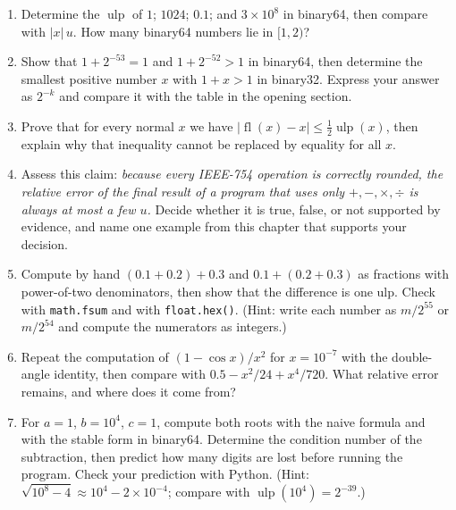 \begin{latihan}
\begin{enumerate}
  \item Determine the $\operatorname{ulp}$ of $1$; $1024$; $0.1$; and $3\times10^{8}$
        in binary64, then compare with $|x|\,u$. How many binary64
        numbers lie in $[1,2)$?

  \item Show that $1+2^{-53}=1$ and $1+2^{-52}>1$ in binary64, then determine
        the smallest positive number $x$ with $1+x>1$ in binary32. Express
        your answer as $2^{-k}$ and compare it with the table in the opening section.

  \item Prove that for every normal $x$ we have
        $|\operatorname{fl}(x)-x|\le\tfrac12\operatorname{ulp}(x)$, then explain
        why that inequality cannot be replaced by equality for all $x$.

  \item Assess this claim: \emph{because every IEEE-754 operation is correctly rounded,
        the relative error of the final result of a program that uses only $+,-,\times,\div$ is always
        at most a few $u$.} Decide whether it is true, false, or not supported by
        evidence, and name one example from this chapter that supports your decision.

  \item Compute by hand $(0.1+0.2)+0.3$ and $0.1+(0.2+0.3)$ as
        fractions with power-of-two denominators, then show that the difference is one ulp.
        Check with \texttt{math.fsum} and with \texttt{float.hex()}.
        (Hint: write each number as $m/2^{55}$ or $m/2^{54}$ and
        compute the numerators as integers.)

  \item Repeat the computation of $(1-\cos x)/x^{2}$ for $x=10^{-7}$ with the double-angle
        identity, then compare with $0.5-x^{2}/24+x^{4}/720$. What relative error
        remains, and where does it come from?

  \item For $a=1$, $b=10^{4}$, $c=1$, compute both roots with the naive formula and with
        the stable form in binary64. Determine the condition number of the subtraction, then
        predict how many digits are lost before running the program. Check
        your prediction with Python.
        (Hint: $\sqrt{10^{8}-4}\approx10^{4}-2\times10^{-4}$; compare with
        $\operatorname{ulp}(10^{4})=2^{-39}$.)


\end{enumerate}
\end{latihan}
